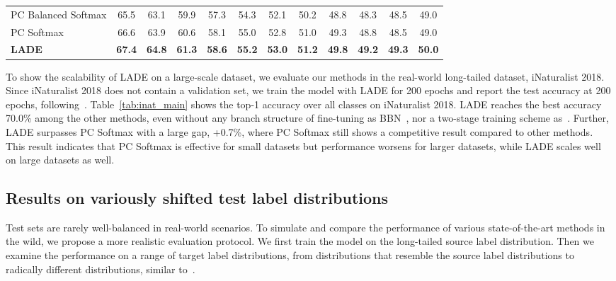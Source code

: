 \documentclass[final]{cvpr}
\begin{document}
\begin{table*}[t]
{\begin{tabular}{l|ccccc|c|ccccc}
	PC Balanced Softmax & 65.5 & 63.1 & 59.9 & 57.3 & 54.3 & 52.1 & 50.2 & 48.8 & 48.3 & 48.5 & 49.0 \\
	PC Softmax & 66.6 & 63.9 & 60.6 & 58.1 & 55.0 & 52.8 & 51.0 & 49.3 & 48.8 & 48.5 & 49.0 \\
    \midrule
	\textbf{LADE} & \textbf{67.4} & \textbf{64.8} & \textbf{61.3} & \textbf{58.6} & \textbf{55.2} & \textbf{53.0} & \textbf{51.2} & \textbf{49.8} & \textbf{49.2} & \textbf{49.3} & \textbf{50.0} \\
	\bottomrule
	\end{tabular}
}
\label{tab:imagenet_test_shift}
\vspace{0mm}
\end{table*} To show the scalability of LADE on a large-scale dataset, we evaluate our methods in the real-world long-tailed dataset, iNaturalist 2018.
Since iNaturalist 2018 does not contain a validation set, we train the model with LADE for 200 epochs and report the test accuracy at 200 epochs, following~\cite{kang2019decoupling}.
Table~\ref{tab:inat_main} shows the top-1 accuracy over all classes on iNaturalist 2018.
LADE reaches the best accuracy 70.0\% among the other methods, even without any branch structure of fine-tuning as BBN~\cite{zhou2020bbn}, nor a two-stage training scheme as~\cite{kang2019decoupling}.
Further, LADE surpasses PC Softmax with a large gap, +0.7\%, where PC Softmax still shows a competitive result compared to other methods.
This result indicates that PC Softmax is effective for small datasets but performance worsens for larger datasets, while LADE scales well on large datasets as well.

\subsection{Results on variously shifted test label distributions}\label{subsec:4_3_results_on_imbalanced_test_label_distribution}
Test sets are rarely well-balanced in real-world scenarios.
To simulate and compare the performance of various state-of-the-art methods in the wild, we propose a more realistic evaluation protocol. 
We first train the model on the long-tailed source label distribution.
Then we examine the performance on a range of target label distributions, from distributions that resemble the source label distributions to radically different distributions, similar to~\cite{azizzadenesheli2019regularized, lipton2018detecting}.
\end{document}
